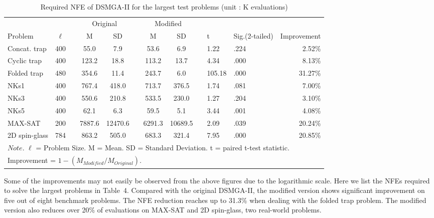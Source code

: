 \begin{table}[ht]
\centering
\label{my-label}
\begin{tabular}{lclcclcclllr}
\hline
              &        &  & \multicolumn{2}{c}{Original} &  & \multicolumn{2}{c}{Modified} &  &       		&					&         		\\ \cline{4-5} \cline{7-8}
Problem       & $\ell$ &  & M            & SD            &  & M            & SD            &  & t			& Sig.(2-tailed)	& Improvement  \\ \hline
Concat. trap  & 400    &  & 55.0         & 7.9           &  & 53.6         & 6.9           &  & 1.22   		& .224				& 2.52\%  \\
Cyclic trap   & 400    &  & 123.2        & 18.8          &  & 113.2        & 13.7          &  & 4.34	  	& .000				& 8.13\%  \\
Folded trap   & 480    &  & 354.6        & 11.4          &  & 243.7        & 6.0           &  & 105.18 		& .000				& 31.27\% \\
NKs1          & 400    &  & 767.4        & 418.0         &  & 713.7        & 376.5         &  & 1.74     	& .081				& 7.00\%  \\
NKs3          & 400    &  & 550.6        & 210.8         &  & 533.5        & 230.0         &  & 1.27  	   	& .204				& 3.10\%  \\
NKs5          & 400    &  & 62.1         & 6.3           &  & 59.5         & 5.1           &  & 3.44  		& .001				& 4.08\%  \\
MAX-SAT       & 200    &  & 7887.6       & 12470.6       &  & 6291.3       & 10689.5       &  & 2.09    	& .039				& 20.24\% \\
2D spin-glass & 784    &  & 863.2        & 505.0         &  & 683.3        & 321.4         &  & 7.95		& .000				& 20.85\% \\ 
\hline 
\multicolumn{12}{l}{$Note.$ $\ell$ = Problem Size. M = Mean. SD = Standard Deviation. t = paired t-test statistic.} \\
\multicolumn{12}{l}{Improvement = $1 - (M_{Modified}/M_{Original})$. }
\end{tabular}
\caption{Required NFE of DSMGA-II for the largest test problems (unit : K evaluations)}
\end{table}



Some of the improvements may not easily be observed from the above figures due to the logarithmic scale. Here we list the NFEs required to solve the largest problems in Table~4.  Compared with the original DSMGA-II, the modified version shows significant improvement on five out of eight benchmark problems. The NFE reduction reaches up to 31.3\% when dealing with the folded trap problem. 
The modified version also reduces over 20\% of evaluations on MAX-SAT and 2D spin-glass, two real-world problems. 

